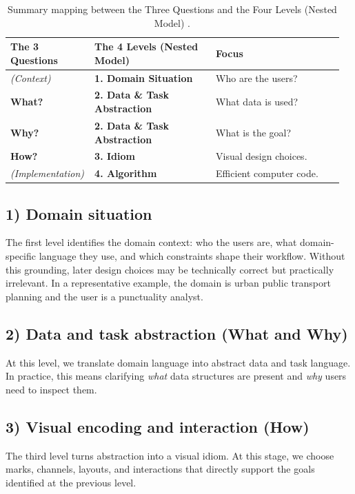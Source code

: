 \begin{table}[tbp]
    \centering
    \small
    \begin{tabular}{@{}p{0.22\linewidth}p{0.36\linewidth}p{0.38\linewidth}@{}}
        \textbf{The 3 Questions} & \textbf{The 4 Levels (Nested Model)} & \textbf{Focus} \\
        \hline
        \textit{(Context)} & \textbf{1. Domain Situation} & Who are the users? \\
        \textbf{What?} & \textbf{2. Data \& Task Abstraction} & What data is used? \\
        \textbf{Why?} & \textbf{2. Data \& Task Abstraction} & What is the goal? \\
        \textbf{How?} & \textbf{3. Idiom} & Visual design choices. \\
        \textit{(Implementation)} & \textbf{4. Algorithm} & Efficient computer code. \\
    \end{tabular}
    \caption{Summary mapping between the Three Questions and the Four Levels (Nested Model) \parencite{munzner2014}.}
    \label{tab:three-questions-four-levels}
\end{table}


\subsection*{1) Domain situation}
The first level identifies the domain context: who the users are, what domain-specific language they use, and which constraints shape their workflow. Without this grounding, later design choices may be technically correct but practically irrelevant. In a representative example, the domain is urban public transport planning and the user is a punctuality analyst.

\subsection*{2) Data and task abstraction (What and Why)}
At this level, we translate domain language into abstract data and task language. In practice, this means clarifying \textit{what} data structures are present and \textit{why} users need to inspect them.~

\subsection*{3) Visual encoding and interaction (How)}
The third level turns abstraction into a visual idiom. At this stage, we choose marks, channels, layouts, and interactions that directly support the goals identified at the previous level.

